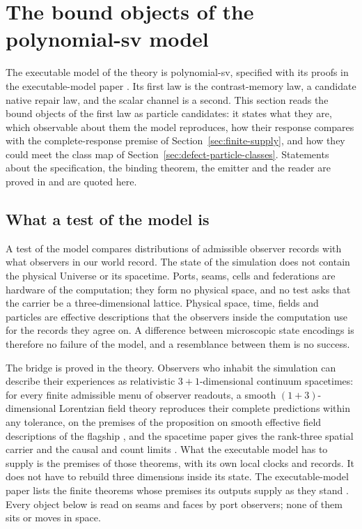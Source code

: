 \section{The bound objects of the polynomial-sv model}
\label{sec:psv-objects}

The executable model of the theory is polynomial-sv, specified with its proofs in the
executable-model paper \cite{ophmodel}. Its first law is the contrast-memory law, a
candidate native repair law, and the scalar channel is a second. This section reads the
bound objects of the first law as particle
candidates: it states what they are, which observable about them the model reproduces,
how their response compares with the complete-response premise of
Section~\ref{sec:finite-supply}, and how they could meet the class map of
Section~\ref{sec:defect-particle-classes}. Statements about the specification, the
binding theorem, the emitter and the reader are proved in \cite{ophmodel} and are quoted
here.

\subsection{What a test of the model is}
\label{sec:psv-test}

A test of the model compares distributions of admissible observer records with what
observers in our world record. The state of the simulation does not contain the physical
Universe or its spacetime. Ports, seams, cells and federations are hardware of the
computation; they form no physical space, and no test asks that the carrier be a
three-dimensional lattice. Physical space, time, fields and particles are effective
descriptions that the observers inside the computation use for the records they agree
on. A difference between microscopic state encodings is therefore no failure of the
model, and a resemblance between them is no success.

The bridge is proved in the theory. Observers who inhabit the simulation can describe
their experiences as relativistic $3+1$-dimensional continuum spacetimes: for every
finite admissible menu of observer readouts, a smooth $(1+3)$-dimensional Lorentzian
field theory reproduces their complete predictions within any tolerance, on the premises
of the proposition on smooth
effective field descriptions of the flagship \cite{flagship}, and the spacetime paper
gives the rank-three spatial carrier and the causal and count limits \cite{ophEinstein}.
What the executable model has to supply is the premises of those theorems, with its own
local clocks and records. It does not have to rebuild three dimensions inside its state.
The executable-model paper lists the finite theorems whose premises its outputs supply as
they stand \cite{ophmodel}.
Every object below is read on seams and faces by port observers; none of them sits or
moves in space.

